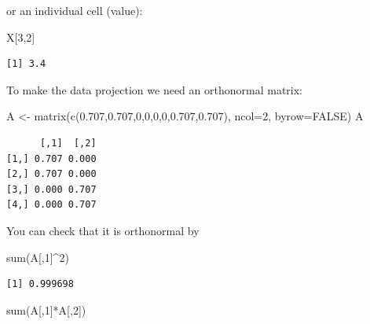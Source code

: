 \documentclass[
  letterpaper,
]{krantz}
\newenvironment{Shaded}{\begin{snugshade}}{\end{snugshade}}
\newcommand{\AttributeTok}[1]{\textcolor[rgb]{0.40,0.45,0.13}{#1}}
\newcommand{\ConstantTok}[1]{\textcolor[rgb]{0.56,0.35,0.01}{#1}}
\newcommand{\DecValTok}[1]{\textcolor[rgb]{0.68,0.00,0.00}{#1}}
\newcommand{\FloatTok}[1]{\textcolor[rgb]{0.68,0.00,0.00}{#1}}
\newcommand{\FunctionTok}[1]{\textcolor[rgb]{0.28,0.35,0.67}{#1}}
\newcommand{\NormalTok}[1]{\textcolor[rgb]{0.00,0.23,0.31}{#1}}
\newcommand{\OtherTok}[1]{\textcolor[rgb]{0.00,0.23,0.31}{#1}}
\newcommand{\SpecialCharTok}[1]{\textcolor[rgb]{0.37,0.37,0.37}{#1}}
\begin{document}
or an individual cell (value):

\begin{Shaded}
\begin{Highlighting}[]
\NormalTok{X[}\DecValTok{3}\NormalTok{,}\DecValTok{2}\NormalTok{]}
\end{Highlighting}
\end{Shaded}

\begin{verbatim}
[1] 3.4
\end{verbatim}

To make the data projection we need an orthonormal matrix:

\begin{Shaded}
\begin{Highlighting}[]
\NormalTok{A }\OtherTok{\textless{}{-}} \FunctionTok{matrix}\NormalTok{(}\FunctionTok{c}\NormalTok{(}\FloatTok{0.707}\NormalTok{,}\FloatTok{0.707}\NormalTok{,}\DecValTok{0}\NormalTok{,}\DecValTok{0}\NormalTok{,}\DecValTok{0}\NormalTok{,}\DecValTok{0}\NormalTok{,}\FloatTok{0.707}\NormalTok{,}\FloatTok{0.707}\NormalTok{),}
            \AttributeTok{ncol=}\DecValTok{2}\NormalTok{, }\AttributeTok{byrow=}\ConstantTok{FALSE}\NormalTok{)}
\NormalTok{A}
\end{Highlighting}
\end{Shaded}

\begin{verbatim}
      [,1]  [,2]
[1,] 0.707 0.000
[2,] 0.707 0.000
[3,] 0.000 0.707
[4,] 0.000 0.707
\end{verbatim}

You can check that it is orthonormal by

\begin{Shaded}
\begin{Highlighting}[]
\FunctionTok{sum}\NormalTok{(A[,}\DecValTok{1}\NormalTok{]}\SpecialCharTok{\^{}}\DecValTok{2}\NormalTok{)}
\end{Highlighting}
\end{Shaded}

\begin{verbatim}
[1] 0.999698
\end{verbatim}

\begin{Shaded}
\begin{Highlighting}[]
\FunctionTok{sum}\NormalTok{(A[,}\DecValTok{1}\NormalTok{]}\SpecialCharTok{*}\NormalTok{A[,}\DecValTok{2}\NormalTok{])}
\end{Highlighting}
\end{Shaded}
\end{document}
